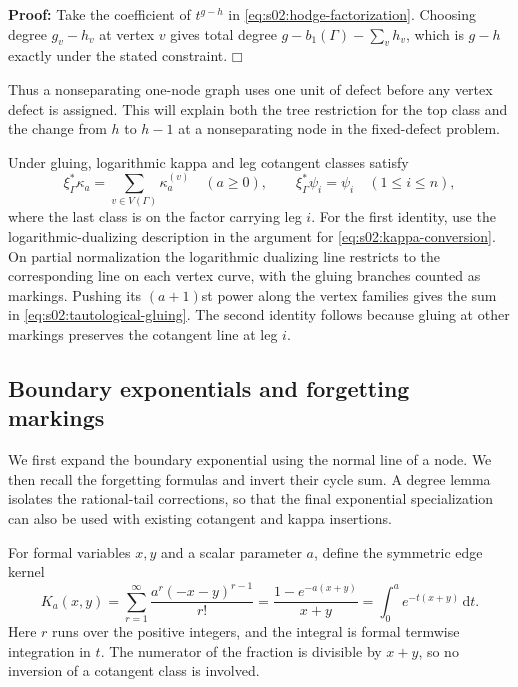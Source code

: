 \documentclass[a4paper,10pt]{article}
\numberwithin{equation}{section}
\newcommand{\dd}{\mathrm{d}}
\theoremstyle{paperplain}
\theoremstyle{paperremark}
\theoremstyle{paperplain}
\newenvironment{prf}{\noindent \textbf{Proof: }}{\hfill $\mdlgwhtsquare$\par\addvspace{0.5\baselineskip}}
\begin{document}
\begin{prf}
Take the coefficient of $t^{g-h}$ in
\eqref{eq:s02:hodge-factorization}.  Choosing degree $g_v-h_v$ at
vertex $v$ gives total degree
$g-b_1(\Gamma)-\sum_v h_v$, which is $g-h$ exactly under the stated
constraint.
\end{prf}

Thus a nonseparating one-node graph uses one unit of defect before any
vertex defect is assigned.  This will explain both the tree restriction
for the top class and the change from $h$ to $h-1$ at a nonseparating
node in the fixed-defect problem.

Under gluing, logarithmic kappa and leg cotangent classes satisfy
\begin{equation}
\label{eq:s02:tautological-gluing}
\xi_\Gamma^*\kappa_a=\sum_{v\in V(\Gamma)}\kappa_a^{(v)}
\quad(a\geq0),
\qquad
\xi_\Gamma^*\psi_i=\psi_i\quad(1\leq i\leq n),
\end{equation}
where the last class is on the factor carrying leg $i$.  For the first
identity, use the logarithmic-dualizing description in the argument for
\eqref{eq:s02:kappa-conversion}.  On partial normalization the
logarithmic dualizing line restricts to the corresponding line on each
vertex curve, with the gluing branches counted as markings.  Pushing
its $(a+1)$st power along the vertex families gives the sum in
\eqref{eq:s02:tautological-gluing}.  The second identity follows because
gluing at other markings preserves the cotangent line at leg $i$.

\subsection{Boundary exponentials and forgetting markings}
\label{subsec:s02:04}

We first expand the boundary exponential using the normal line of a
node.  We then recall the forgetting formulas and invert their cycle
sum.  A degree lemma isolates the rational-tail corrections, so that
the final exponential specialization can also be used with existing
cotangent and kappa insertions.

For formal variables $x,y$ and a scalar parameter $a$, define the
symmetric edge kernel
\begin{equation}
\label{eq:s02:edge-kernel}
K_a(x,y)=\sum_{r=1}^{\infty}\frac{a^r(-x-y)^{r-1}}{r!}
=\frac{1-e^{-a(x+y)}}{x+y}
=\int_0^a e^{-t(x+y)}\,\dd t.
\end{equation}
Here $r$ runs over the positive integers, and the integral is formal
termwise integration in $t$.  The numerator of the fraction is
divisible by $x+y$, so no inversion of a cotangent class is involved.
\end{document}
